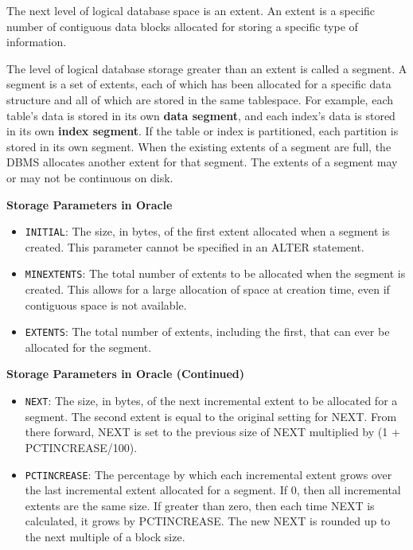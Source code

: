 \documentclass[11pt]{article}
\newcommand{\vs}[]{
    \vspace{11pt}
}
\newcommand{\boldsec}[1]{
    \vspace{11pt}
    \textbf{#1}
    \vspace{11pt}
}
\newcommand{\boldsecbottom}[1]{
    \textbf{#1}
    \vspace{11pt}
}
\begin{document}
The next level of logical database space is an extent. An extent is a specific number of contiguous data blocks allocated for storing a specific type of information. 

The level of logical database storage greater than an extent is called a segment. A segment is a set of extents, each of which has been allocated for a specific data structure and all of which are stored in the same tablespace. For example, each table's data is stored in its own \textbf{data segment}, and each index's data is stored in its own \textbf{index segment}. If the table or index is partitioned, each partition is stored in its own segment. When the existing extents of a segment are full, the DBMS allocates another extent for that segment. The extents of a segment may or may not be continuous on disk.

\boldsec{Storage Parameters in Oracle}

\begin{itemize}
    \item \texttt{INITIAL}: The size, in bytes, of the first extent allocated when a segment is created. This parameter cannot be specified in an ALTER statement.
    \item \texttt{MINEXTENTS}: The total number of extents to be allocated when the segment is created. This allows for a large allocation of space at creation time, even if contiguous space is not available.
    \item \texttt{EXTENTS}: The total number of extents, including the first, that can ever be allocated for the segment.
\end{itemize}
\vs

\boldsecbottom{Storage Parameters in Oracle (Continued)}

\begin{itemize}
    \item \texttt{NEXT}: The size, in bytes, of the next incremental extent to be allocated for a segment. The second extent is equal to the original setting for NEXT. From there forward, NEXT is set to the previous size of NEXT multiplied by (1 + PCTINCREASE/100).
    \item \texttt{PCTINCREASE}: The percentage by which each incremental extent grows over the last incremental extent allocated for a segment. If 0, then all incremental extents are the same size. If greater than zero, then each time NEXT is calculated, it grows by PCTINCREASE. The new NEXT is rounded up to the next multiple of a block size.
\end{itemize}
\vs
\end{document}
